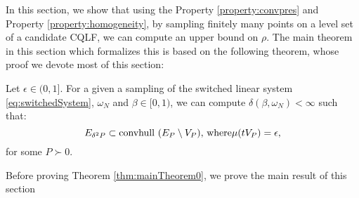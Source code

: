 In this section, we show that using the Property \ref{property:convpres} and Property \ref{property:homogeneity}, by sampling finitely many points on a level set of a candidate CQLF, we can compute an upper bound on $\rho$. The main theorem in this section which formalizes this is based on the following theorem, whose proof we devote most of this section:

\begin{theorem} \label{thm:mainTheorem0} Let $\epsilon \in (0,1]$. For a given a sampling of the switched linear system \eqref{eq:switchedSystem}, $\omega_N$ and $\beta \in [0,1)$, we can compute $\delta(\beta, \omega_N) < \infty$ such that:
\begin{equation}E_{\delta^2P} \subset  \mbox{convhull } (E_P \setminus V_{P}), \, \text{where} \mu(tV_P) = \epsilon,
\end{equation}
for some $P \succ 0$.
\end{theorem}

Before proving Theorem \ref{thm:mainTheorem0}, we prove the main result of this section

